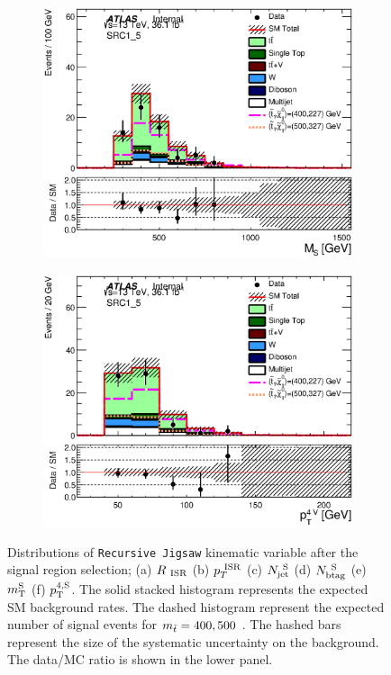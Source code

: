 \begin{figure}[h!]
\begin{center}
\begin{subfigure}[b]{0.40\textwidth}
    	 \includegraphics[width=\textwidth]{figures/plotRegion/CA_MS_SRC1_5.eps}
                \caption{ }
    \end{subfigure}
    \begin{subfigure}[b]{0.40\textwidth}    
    	 \includegraphics[width=\textwidth]{figures/plotRegion/CA_pTjV4_SRC1_5.eps}
               \caption{ }
    \end{subfigure}
     \caption[Distributions of kinematic variable after the signal region selection]{ Distributions of {\tt Recursive Jigsaw} kinematic variable after the signal region selection;  (a) $R_{~\mathrm{ISR}}$  (b) $p_{T}^{~\mathrm{ISR}}$ (c) $N_{\mathrm{jet}}^{~\mathrm{S}}$ (d) $N_{\mathrm{btag}}^{~\mathrm{S}}$ (e) $m_{\mathrm{T}}^{\mathrm{S}}$ (f) $p_{\mathrm{T}}^{4,\mathrm{S}}$.  The solid stacked histogram represents the expected SM background rates. The dashed histogram represent the expected number of signal events for $m_{\tilde{t}} = 400,500$ \gev.  The hashed bars represent the size of the systematic uncertainty on the background.  The data/MC ratio is shown in the lower panel. }
  \label{fig:SR2}
  

\end{center}
\end{figure}

